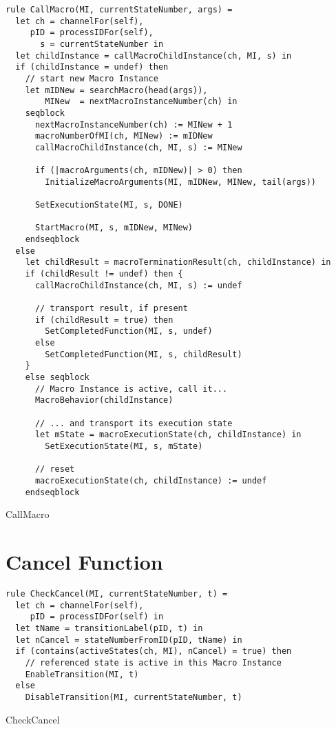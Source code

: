 \begin{listing}[H]
\begin{verbatim}
rule CallMacro(MI, currentStateNumber, args) =
  let ch = channelFor(self),
     pID = processIDFor(self),
       s = currentStateNumber in
  let childInstance = callMacroChildInstance(ch, MI, s) in
  if (childInstance = undef) then
    // start new Macro Instance
    let mIDNew = searchMacro(head(args)),
        MINew  = nextMacroInstanceNumber(ch) in
    seqblock
      nextMacroInstanceNumber(ch) := MINew + 1
      macroNumberOfMI(ch, MINew) := mIDNew
      callMacroChildInstance(ch, MI, s) := MINew

      if (|macroArguments(ch, mIDNew)| > 0) then
        InitializeMacroArguments(MI, mIDNew, MINew, tail(args))

      SetExecutionState(MI, s, DONE)

      StartMacro(MI, s, mIDNew, MINew)
    endseqblock
  else
    let childResult = macroTerminationResult(ch, childInstance) in
    if (childResult != undef) then {
      callMacroChildInstance(ch, MI, s) := undef

      // transport result, if present
      if (childResult = true) then
        SetCompletedFunction(MI, s, undef)
      else
        SetCompletedFunction(MI, s, childResult)
    }
    else seqblock
      // Macro Instance is active, call it...
      MacroBehavior(childInstance)

      // ... and transport its execution state
      let mState = macroExecutionState(ch, childInstance) in
        SetExecutionState(MI, s, mState)

      // reset
      macroExecutionState(ch, childInstance) := undef
    endseqblock
\end{verbatim}
\caption{CallMacro}
\label{lst:asm:CallMacro}
\end{listing}


\section{Cancel Function}


\begin{listing}[H]
\begin{verbatim}
rule CheckCancel(MI, currentStateNumber, t) =
  let ch = channelFor(self),
     pID = processIDFor(self) in
  let tName = transitionLabel(pID, t) in
  let nCancel = stateNumberFromID(pID, tName) in
  if (contains(activeStates(ch, MI), nCancel) = true) then
    // referenced state is active in this Macro Instance
    EnableTransition(MI, t)
  else
    DisableTransition(MI, currentStateNumber, t)
\end{verbatim}
\caption{CheckCancel}
\label{lst:asm:CheckCancel}
\end{listing}




